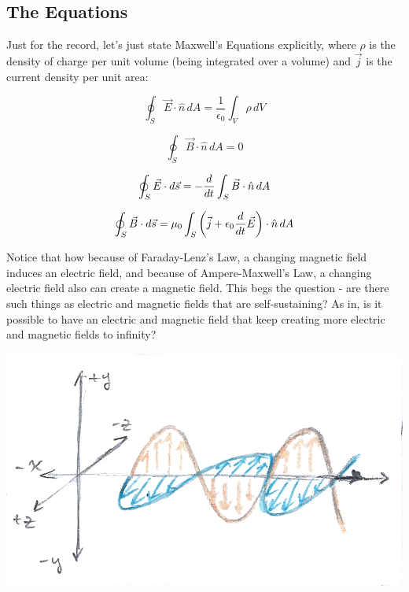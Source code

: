 \subsection{The Equations}
Just for the record, let's just state Maxwell's Equations explicitly, where $\rho$ is the density of charge per unit volume (being integrated over a volume) and $\vec j$ is the current density per unit area:
\begin{mdframed}[frametitle=Gauss' Law for Electric Fields]
	$$\oint_S \vec E \cdot \hat n \, dA = \frac{1}{\epsilon_0} \int_V \rho \, dV$$
\end{mdframed}
\begin{mdframed}[frametitle=Gauss' Law for Magnetic Fields]
	$$\oint_S \vec B \cdot \hat n \, dA = 0$$
\end{mdframed}
\begin{mdframed}[frametitle=Faraday-Lenz's Law of Induction]
	$$\oint_S \vec E \cdot d\vec s = -\frac{d }{d t} \int_S \vec B \cdot \hat n \, dA$$
\end{mdframed}
\begin{mdframed}[frametitle=Ampere-Maxwell's Circuital Law]
	$$\oint_S \vec B \cdot d\vec s = \mu_0 \int_S \left(\vec j + \epsilon_0  \frac{d }{d t}\vec E\right) \cdot \hat n \, dA$$
\end{mdframed}
Notice that how because of Faraday-Lenz's Law, a changing magnetic field induces an electric field, and because of Ampere-Maxwell's Law, a changing electric field also can create a magnetic field. This begs the question - are there such things as electric and magnetic fields that are self-sustaining? As in, is it possible to have an electric and magnetic field that keep creating more electric and magnetic fields to infinity? 
\begin{center}
	\includegraphics[scale=0.25]{images/em/em-waves.png}
\end{center}
